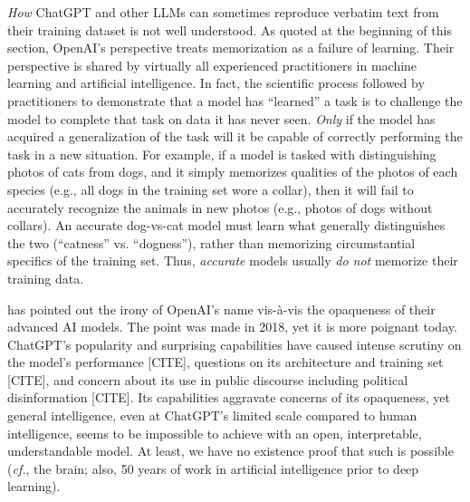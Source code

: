 \documentclass{article}
\begin{document}
\emph{How} ChatGPT and other LLMs can sometimes reproduce verbatim text from their training dataset is not well understood. As quoted at the beginning of this section, OpenAI's perspective treats memorization as a failure of learning. Their perspective is shared by virtually all experienced practitioners in machine learning and artificial intelligence. In fact, the scientific process followed by practitioners to demonstrate that a model has ``learned'' a task is to challenge the model to complete that task on data it has never seen. \emph{Only} if the model has acquired a generalization of the task will it be capable of correctly performing the task in a new situation. For example, if a model is tasked with distinguishing photos of cats from dogs, and it simply memorizes qualities of the photos of each species (e.g., all dogs in the training set wore a collar), then it will fail to accurately recognize the animals in new photos (e.g., photos of dogs without collars). An accurate dog-vs-cat model must learn what generally distinguishes the two (``catness'' vs. ``dogness''), rather than memorizing circumstantial specifics of the training set. Thus, \emph{accurate} models usually \emph{do not} memorize their training data.

\cite{sudmann2018media} has pointed out the irony of OpenAI's name vis-\`{a}-vis the opaqueness of their advanced AI models. The point was made in 2018, yet it is more poignant today. ChatGPT's popularity and surprising capabilities have caused intense scrutiny on the model's performance [CITE], questions on its architecture and training set [CITE], and concern about its use in public discourse including political disinformation [CITE]. Its capabilities aggravate concerns of its opaqueness, yet general intelligence, even at ChatGPT's limited scale compared to human intelligence, seems to be impossible to achieve with an open, interpretable, understandable model. At least, we have no existence proof that such is possible (\emph{cf.}, the brain; also, 50 years of work in artificial intelligence prior to deep learning).
\end{document}
